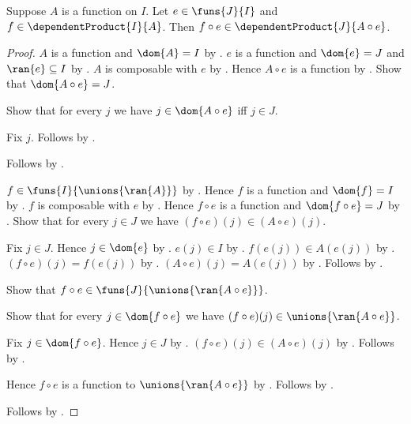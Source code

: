 \begin{proposition}\label{spike_dependent_precomposition_type}
    Suppose $A$ is a function on $I$.
    Let $e\in\funs{J}{I}$ and $f\in\dependentProduct{I}{A}$.
    Then $f\circ e\in\dependentProduct{J}{A\circ e}$.
\end{proposition}
\begin{proof}
    $A$ is a function and $\dom{A}=I$ by \auto.
    $e$ is a function and $\dom{e}=J$ and $\ran{e}\subseteq I$ by
        .
    $A$ is composable with $e$ by \auto.
    Hence $A\circ e$ is a function by .
    Show that $\dom{A\circ e}=J$.
    \begin{subproof}
        Show that for every $j$ we have
            $j\in\dom{A\circ e}$ iff $j\in J$.
        \begin{subproof}
            Fix $j$.
            Follows by
                .
        \end{subproof}
        Follows by .
    \end{subproof}
    $f\in\funs{I}{\unions{\ran{A}}}$ by
        .
    Hence $f$ is a function and $\dom{f}=I$ by
        .
    $f$ is composable with $e$ by \auto.
    Hence $f\circ e$ is a function and $\dom{f\circ e}=J$ by
        .
    Show that for every $j\in J$ we have
        $(f\circ e)(j)\in(A\circ e)(j)$.
    \begin{subproof}
        Fix $j\in J$.
        Hence $j\in\dom{e}$ by \auto.
        $e(j)\in I$ by .
        $f(e(j))\in A(e(j))$ by
            .
        $(f\circ e)(j)=f(e(j))$ by
            .
        $(A\circ e)(j)=A(e(j))$ by
            .
        Follows by \auto.
    \end{subproof}
    Show that $f\circ e\in\funs{J}{\unions{\ran{A\circ e}}}$.
    \begin{subproof}
        Show that for every $j\in\dom{f\circ e}$ we have
            $(f\circ e)(j)\in\unions{\ran{A\circ e}}$.
        \begin{subproof}
            Fix $j\in\dom{f\circ e}$.
            Hence $j\in J$ by \auto.
            $(f\circ e)(j)\in(A\circ e)(j)$ by \auto.
            Follows by .
        \end{subproof}
        Hence $f\circ e$ is a function to
            $\unions{\ran{A\circ e}}$ by \auto.
        Follows by .
    \end{subproof}
    Follows by .
\end{proof}

